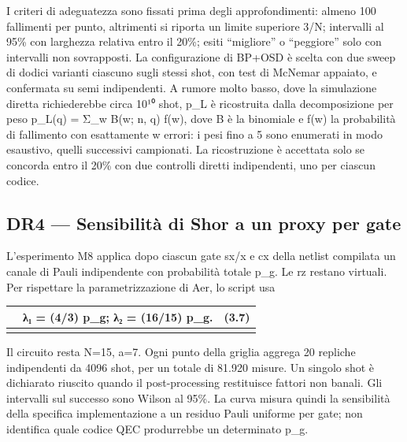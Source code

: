 I criteri di adeguatezza sono fissati prima degli approfondimenti: almeno 100 fallimenti per punto, altrimenti si riporta un limite superiore 3/N; intervalli al 95\% con larghezza relativa entro il 20\%; esiti ``migliore'' o ``peggiore'' solo con intervalli non sovrapposti. La configurazione di BP+OSD è scelta con due sweep di dodici varianti ciascuno sugli stessi shot, con test di McNemar appaiato, e confermata su semi indipendenti. A rumore molto basso, dove la simulazione diretta richiederebbe circa 10¹⁰ shot, p\_L è ricostruita dalla decomposizione per peso p\_L(q) = Σ\_w B(w; n, q) f(w), dove B è la binomiale e f(w) la probabilità di fallimento con esattamente w errori: i pesi fino a 5 sono enumerati in modo esaustivo, quelli successivi campionati. La ricostruzione è accettata solo se concorda entro il 20\% con due controlli diretti indipendenti, uno per ciascun codice.

\subsection{DR4 --- Sensibilità di Shor a un proxy per gate}\label{sec:finale_3_5_5}

L'esperimento M8 applica dopo ciascun gate sx/x e cx della netlist compilata un canale di Pauli indipendente con probabilità totale p\_g. Le rz restano virtuali. Per rispettare la parametrizzazione di Aer, lo script usa

{\def\LTcaptype{none} %
\begin{longtable}[]{@{}
  >{\raggedright\arraybackslash}p{}
  >{\raggedright\arraybackslash}p{}
  >{\raggedright\arraybackslash}p{}@{}}
\toprule\noalign{}
\begin{minipage}[b]{\linewidth}\raggedright
\end{minipage} & \begin{minipage}[b]{\linewidth}\centering
λ₁ = (4/3) p\_g; λ₂ = (16/15) p\_g.
\end{minipage} & \begin{minipage}[b]{\linewidth}\raggedleft
(3.7)
\end{minipage} \\
\midrule\noalign{}
\endhead
\bottomrule\noalign{}
\endlastfoot
\end{longtable}
}

Il circuito resta N=15, a=7. Ogni punto della griglia aggrega 20 repliche indipendenti da 4096 shot, per un totale di 81.920 misure. Un singolo shot è dichiarato riuscito quando il post-processing restituisce fattori non banali. Gli intervalli sul successo sono Wilson al 95\%. La curva misura quindi la sensibilità della specifica implementazione a un residuo Pauli uniforme per gate; non identifica quale codice QEC produrrebbe un determinato p\_g.

